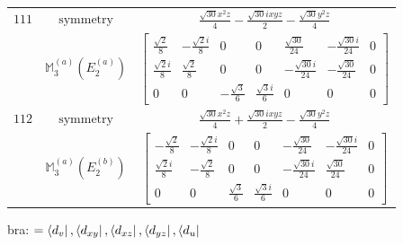 \documentclass[fleqn,8pt,landscape]{jsarticle}
\begin{document}
\begin{longtable}{ccc}
$ 111 $ & $ \text{symmetry} $ & $ \frac{\sqrt{30} x^{2} z}{4} - \frac{\sqrt{30} i x y z}{2} - \frac{\sqrt{30} y^{2} z}{4} $ \\
$  $ & $ \mathbb{M}_{3}^{(a)}(E_{2}^{(a)}) $ & $ \begin{bmatrix} \frac{\sqrt{2}}{8} & - \frac{\sqrt{2} i}{8} & 0 & 0 & \frac{\sqrt{30}}{24} & - \frac{\sqrt{30} i}{24} & 0 \\ \frac{\sqrt{2} i}{8} & \frac{\sqrt{2}}{8} & 0 & 0 & - \frac{\sqrt{30} i}{24} & - \frac{\sqrt{30}}{24} & 0 \\ 0 & 0 & - \frac{\sqrt{3}}{6} & \frac{\sqrt{3} i}{6} & 0 & 0 & 0 \end{bmatrix} $ \\ \hline
$ 112 $ & $ \text{symmetry} $ & $ \frac{\sqrt{30} x^{2} z}{4} + \frac{\sqrt{30} i x y z}{2} - \frac{\sqrt{30} y^{2} z}{4} $ \\
$  $ & $ \mathbb{M}_{3}^{(a)}(E_{2}^{(b)}) $ & $ \begin{bmatrix} - \frac{\sqrt{2}}{8} & - \frac{\sqrt{2} i}{8} & 0 & 0 & - \frac{\sqrt{30}}{24} & - \frac{\sqrt{30} i}{24} & 0 \\ \frac{\sqrt{2} i}{8} & - \frac{\sqrt{2}}{8} & 0 & 0 & - \frac{\sqrt{30} i}{24} & \frac{\sqrt{30}}{24} & 0 \\ 0 & 0 & \frac{\sqrt{3}}{6} & \frac{\sqrt{3} i}{6} & 0 & 0 & 0 \end{bmatrix} $ \\ \hline
\end{longtable}
bra: $=\bra{d_{v}}, \bra{d_{xy}}, \bra{d_{xz}}, \bra{d_{yz}}, \bra{d_{u}}$
\end{document}
